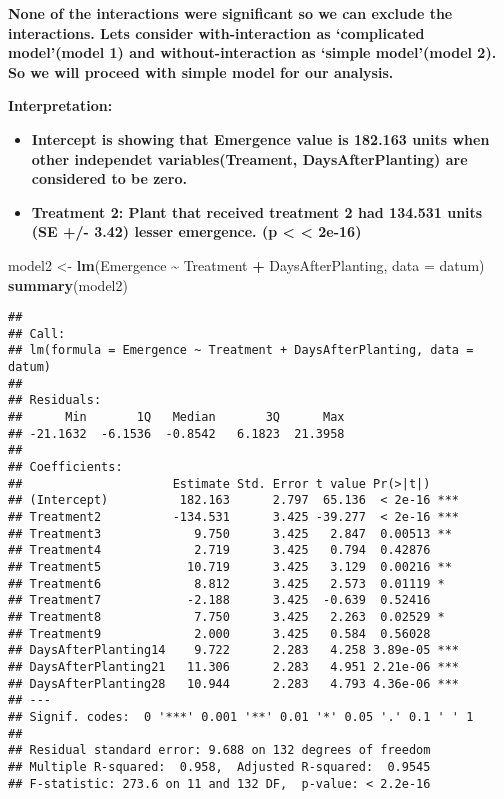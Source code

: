\documentclass[
]{article}
\newenvironment{Shaded}{\begin{snugshade}}{\end{snugshade}}
\newcommand{\AttributeTok}[1]{\textcolor[rgb]{0.13,0.29,0.53}{#1}}
\newcommand{\FunctionTok}[1]{\textcolor[rgb]{0.13,0.29,0.53}{\textbf{#1}}}
\newcommand{\NormalTok}[1]{#1}
\newcommand{\OtherTok}[1]{\textcolor[rgb]{0.56,0.35,0.01}{#1}}
\newcommand{\SpecialCharTok}[1]{\textcolor[rgb]{0.81,0.36,0.00}{\textbf{#1}}}
\begin{document}
\textbf{None of the interactions were significant so we can exclude the
interactions. Lets consider with-interaction as `complicated
model'(model 1) and without-interaction as `simple model'(model 2). So
we will proceed with simple model for our analysis.}

\textbf{Interpretation:}

\begin{itemize}
\item
  \textbf{Intercept is showing that Emergence value is 182.163 units
  when other independet variables(Treament, DaysAfterPlanting) are
  considered to be zero.}
\item
  \textbf{Treatment 2: Plant that received treatment 2 had 134.531 units
  (SE +/- 3.42) lesser emergence. (p \textless{} \textless{} 2e-16)}
\end{itemize}

\begin{Shaded}
\begin{Highlighting}[]
\NormalTok{model2 }\OtherTok{\textless{}{-}} \FunctionTok{lm}\NormalTok{(Emergence }\SpecialCharTok{\textasciitilde{}}\NormalTok{ Treatment }\SpecialCharTok{+}\NormalTok{ DaysAfterPlanting, }\AttributeTok{data =}\NormalTok{ datum)}
\FunctionTok{summary}\NormalTok{(model2)}
\end{Highlighting}
\end{Shaded}

\begin{verbatim}
## 
## Call:
## lm(formula = Emergence ~ Treatment + DaysAfterPlanting, data = datum)
## 
## Residuals:
##      Min       1Q   Median       3Q      Max 
## -21.1632  -6.1536  -0.8542   6.1823  21.3958 
## 
## Coefficients:
##                     Estimate Std. Error t value Pr(>|t|)    
## (Intercept)          182.163      2.797  65.136  < 2e-16 ***
## Treatment2          -134.531      3.425 -39.277  < 2e-16 ***
## Treatment3             9.750      3.425   2.847  0.00513 ** 
## Treatment4             2.719      3.425   0.794  0.42876    
## Treatment5            10.719      3.425   3.129  0.00216 ** 
## Treatment6             8.812      3.425   2.573  0.01119 *  
## Treatment7            -2.188      3.425  -0.639  0.52416    
## Treatment8             7.750      3.425   2.263  0.02529 *  
## Treatment9             2.000      3.425   0.584  0.56028    
## DaysAfterPlanting14    9.722      2.283   4.258 3.89e-05 ***
## DaysAfterPlanting21   11.306      2.283   4.951 2.21e-06 ***
## DaysAfterPlanting28   10.944      2.283   4.793 4.36e-06 ***
## ---
## Signif. codes:  0 '***' 0.001 '**' 0.01 '*' 0.05 '.' 0.1 ' ' 1
## 
## Residual standard error: 9.688 on 132 degrees of freedom
## Multiple R-squared:  0.958,  Adjusted R-squared:  0.9545 
## F-statistic: 273.6 on 11 and 132 DF,  p-value: < 2.2e-16
\end{verbatim}
\end{document}
